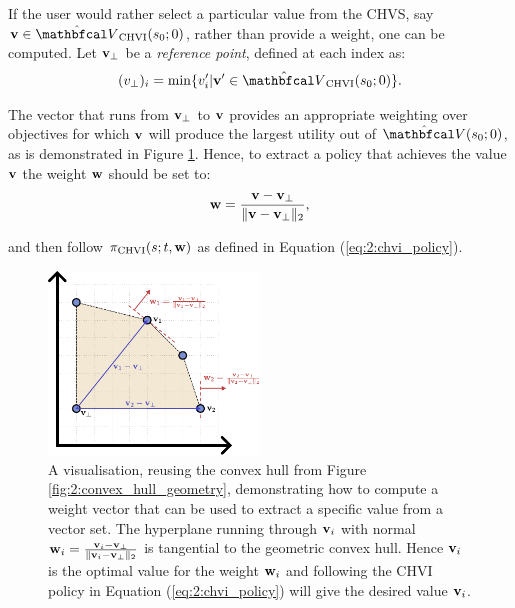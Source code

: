
        If the user would rather select a particular value from the CHVS, say $\bff{v}\in\Vchvi(s_0;0)$, rather than provide a weight, one can be computed. Let $\mathbf{v}_\bot$ be a \textit{reference point}, defined at each index as:
        \begin{align}
            (v_{\bot})_i = \min \{v'_i | \bff{v}'\in\Vchvi(s_0;0) \}. \label{eq:2:chvi_ref_point}
        \end{align} 

        The vector that runs from $\mathbf{v}_\bot$ to $\mathbf{v}$ provides an appropriate weighting over objectives for which $\mathbf{v}$ will produce the largest utility out of $\hat{\bfcl{V}}(s_0;0)$, as is demonstrated in Figure \ref{fig:2:convex_hull_extract_policy_weight}. Hence, to extract a policy that achieves the value $\mathbf{v}$ the weight $\mathbf{w}$ should be set to:
        \begin{align}
            \mathbf{w} = \frac{\mathbf{v}-\mathbf{v}_\bot}{\Vert\mathbf{v}-\mathbf{v}_\bot\Vert_2}, \label{eq:2:chvi_extract_value_weight}
        \end{align}

        and then follow ${\pi_{{\textnormal{CHVI}}}}(s;t,\mathbf{w})$ as defined in Equation (\ref{eq:2:chvi_policy}).
        
        \begin{figure}
            \centering\includegraphics[width=0.5\textwidth]{figures/ch2/ch_extract_policy_weight.pdf} 
            \caption[A visualisation, reusing the convex hull from Figure \ref{fig:2:convex_hull_geometry}, demonstrating how to compute a weight vector that can be used to extract a specific value from a vector set.]{A visualisation, reusing the convex hull from Figure \ref{fig:2:convex_hull_geometry}, demonstrating how to compute a weight vector that can be used to extract a specific value from a vector set. The hyperplane running through $\mathbf{v}_i$ with normal $\mathbf{w}_i=\frac{\mathbf{v}_i-\mathbf{v}_\bot}{\Vert\mathbf{v}_i-\mathbf{v}_\bot\Vert_2}$ is tangential to the geometric convex hull. Hence $\mathbf{v}_i$ is the optimal value for the weight $\mathbf{w}_i$ and following the CHVI policy in Equation (\ref{eq:2:chvi_policy}) will give the desired value $\mathbf{v}_i$.}
            \label{fig:2:convex_hull_extract_policy_weight} 
        \end{figure}











